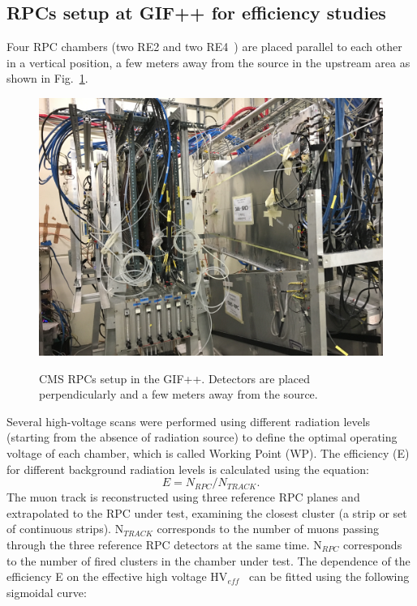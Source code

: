 \subsection{RPCs setup at GIF++ for efficiency studies}\label{eff_calc}
Four RPC chambers (two RE2 and two RE4~\cite{feb}) are placed parallel to each other in a vertical position, a few meters away from the source in the upstream area as shown in Fig.~\ref{fig:rpc_setup}.
\begin{figure}[h]
\centering
\includegraphics[scale=0.07]{fig/wincc/RPC_setup.jpg}\\
 \caption{CMS RPCs setup in the GIF++. Detectors are placed perpendicularly and a few meters away from the source.}
\label{fig:rpc_setup}
\end{figure}
Several high-voltage scans were performed using different radiation levels (starting from the absence of radiation source) to define the optimal operating voltage of each chamber, which is called Working Point (WP). The efficiency (E) for different background radiation levels is calculated using the equation:
\begin{equation}
 {E = N_{RPC}/N_{TRACK}.}
\end{equation}
The muon track is reconstructed using three reference RPC planes and extrapolated to the RPC under test, examining the closest cluster (a strip or set of continuous strips). N$_{TRACK}$ corresponds to the number of muons passing through the three reference RPC detectors at the same time. N$_{RPC}$ corresponds to the number of fired clusters in the chamber under test. The dependence of the efficiency E on the effective high voltage HV$_{eff}$~\cite{hv-eff} can be fitted using the following sigmoidal curve:
